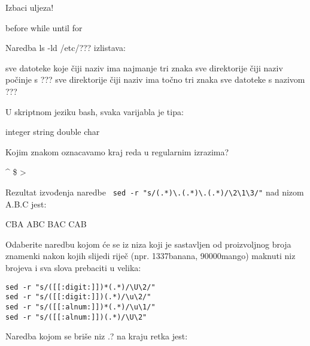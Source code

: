 \documentclass[a4paper,11pt]{exam}
\begin{document}
\begin{questions}
	\question
	Izbaci uljeza!
	
	\begin{oneparchoices}
		\choice before
		\choice while
		\choice until
		\choice for
	\end{oneparchoices}

	\question
	Naredba ls -ld /etc/??? izlistava:
	\begin{oneparchoices}
		\choice sve datoteke koje čiji naziv ima najmanje tri znaka
		\choice sve direktorije čiji naziv počinje s ???
    \choice sve direktorije čiji naziv ima točno tri znaka
	  \choice sve datoteke s nazivom ???
	\end{oneparchoices}
	
	\question
  U skriptnom jeziku bash, svaka varijabla je tipa:
	
	\begin{oneparchoices}
		\choice integer
		\choice string
		\choice double
		\choice char
	\end{oneparchoices}
	
	\question
  Kojim znakom oznacavamo kraj reda u regularnim izrazima?

	\begin{oneparchoices}
		\choice \textasciicircum
		\choice \$
		\choice >
		\choice *
	\end{oneparchoices}

	\question
	Rezultat izvođenja naredbe \verb| sed -r "s/(.*)\.(.*)\.(.*)/\2\1\3/"| nad nizom A.B.C jest:
	
	\begin{oneparchoices}
		\choice CBA
		\choice ABC
		\choice BAC
		\choice CAB
	\end{oneparchoices}
	
	\question
	Odaberite naredbu kojom će se iz niza koji je sastavljen od proizvoljnog broja znamenki nakon kojih slijedi riječ (npr. 1337banana, 90000mango) maknuti niz brojeva i sva slova prebaciti u velika:

	\begin{oneparchoices}
		\choice \verb|sed -r "s/([[:digit:]])*(.*)/\U\2/"| \\ 
		\choice \verb|sed -r "s/([[:digit:]])(.*)/\u\2/"|  \\
		\choice \verb|sed -r "s/([[:alnum:]])*(.*)/\u\1/"| \\
		\choice \verb|sed -r "s/([[:alnum:]])(.*)/\U\2"| 
	\end{oneparchoices}


  \question
  Naredba kojom se briše niz .? na kraju retka jest: 


\end{questions}
\end{document}
